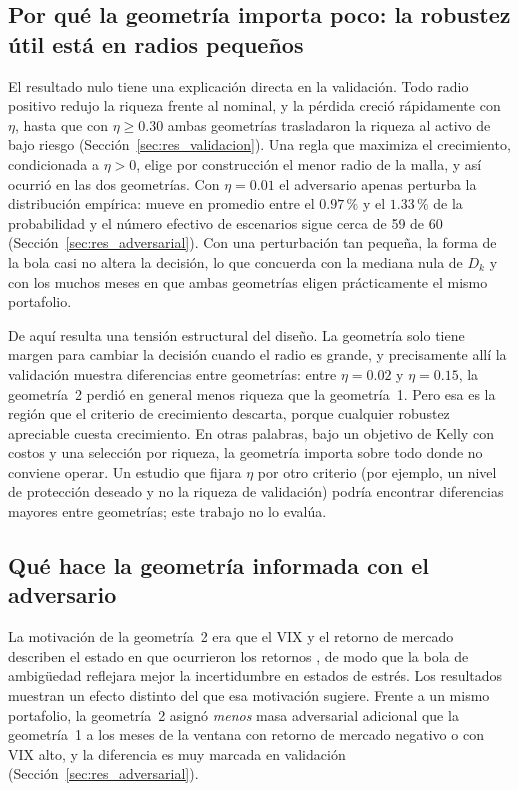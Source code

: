 \subsection{Por qué la geometría importa poco: la robustez útil está en radios pequeños}\label{sec:disc_eta}

El resultado nulo tiene una explicación directa en la validación. Todo radio positivo redujo la riqueza frente al nominal, y la pérdida creció rápidamente con $\eta$, hasta que con $\eta\ge0.30$ ambas geometrías trasladaron la riqueza al activo de bajo riesgo (Sección~\ref{sec:res_validacion}). Una regla que maximiza el crecimiento, condicionada a $\eta>0$, elige por construcción el menor radio de la malla, y así ocurrió en las dos geometrías. Con $\eta=0.01$ el adversario apenas perturba la distribución empírica: mueve en promedio entre el $0.97\,\%$ y el $1.33\,\%$ de la probabilidad y el número efectivo de escenarios sigue cerca de 59 de 60 (Sección~\ref{sec:res_adversarial}). Con una perturbación tan pequeña, la forma de la bola casi no altera la decisión, lo que concuerda con la mediana nula de $D_k$ y con los muchos meses en que ambas geometrías eligen prácticamente el mismo portafolio.

De aquí resulta una tensión estructural del diseño. La geometría solo tiene margen para cambiar la decisión cuando el radio es grande, y precisamente allí la validación muestra diferencias entre geometrías: entre $\eta=0.02$ y $\eta=0.15$, la geometría~2 perdió en general menos riqueza que la geometría~1. Pero esa es la región que el criterio de crecimiento descarta, porque cualquier robustez apreciable cuesta crecimiento. En otras palabras, bajo un objetivo de Kelly con costos y una selección por riqueza, la geometría importa sobre todo donde no conviene operar. Un estudio que fijara $\eta$ por otro criterio (por ejemplo, un nivel de protección deseado y no la riqueza de validación) podría encontrar diferencias mayores entre geometrías; este trabajo no lo evalúa.

\subsection{Qué hace la geometría informada con el adversario}\label{sec:disc_mecanismo}

La motivación de la geometría~2 era que el VIX y el retorno de mercado describen el estado en que ocurrieron los retornos \citep{whaley2000,french1987}, de modo que la bola de ambigüedad reflejara mejor la incertidumbre en estados de estrés. Los resultados muestran un efecto distinto del que esa motivación sugiere. Frente a un mismo portafolio, la geometría~2 asignó \emph{menos} masa adversarial adicional que la geometría~1 a los meses de la ventana con retorno de mercado negativo o con VIX alto, y la diferencia es muy marcada en validación (Sección~\ref{sec:res_adversarial}).


